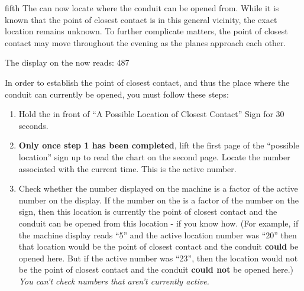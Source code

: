 \documentclass[notebook]{elementals}
\begin{document}
\begin{page}{fifth}
The \iTricorder{} can now locate where the conduit can be opened from. While it is known that the point of closest contact is in this general vicinity, the exact location remains unknown. To further complicate matters, the point of closest contact may move throughout the evening as the planes approach each other.

The display on the \iTricorder{} now reads: {\huge 487}

In order to establish the point of closest contact, and thus the place where the conduit can currently be opened, you must follow these steps:
\begin{enumerate}
  \item Hold the \iTricorder{} in front of ``A Possible Location of Closest Contact'' Sign for 30 seconds.
  \item {\bf Only once step 1 has been completed}, lift the first page of the ``possible location'' sign up to read the chart on the second page. Locate the number associated with the current time. This is the active number.
  \item Check whether the number displayed on the machine is a factor of the active number on the \iTricorder{} display. If the number on the \iTricorder{} is a factor of the number on the sign, then this location is currently the point of closest contact and the conduit can be opened from this location - if you know how. (For example, if the machine display reads ``5'' and the active location number was ``20'' then that location would be the point of closest contact and the conduit {\bf could} be opened here. But if the active number was ``23'', then the location would not be the point of closest contact and the conduit {\bf could not} be opened here.) \emph{You can't check numbers that aren't currently active.} 
\end{enumerate}

\end{page}


\endnotebook
\end{document}
